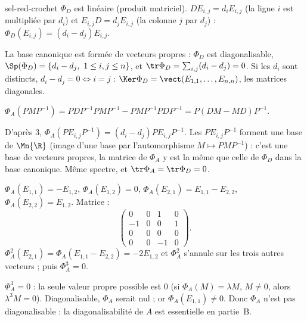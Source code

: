 \begin{corrige}{sel-red-crochet}
 $\Phi_D$ est linéaire (produit matriciel). $DE_{i,j}=d_iE_{i,j}$ (la ligne $i$ est multipliée par $d_i$) et $E_{i,j}D=d_jE_{i,j}$
(la colonne $j$ par $d_j$) : $\Phi_D(E_{i,j})=(d_i-d_j)E_{i,j}$.

 La base canonique est formée de vecteurs propres : $\Phi_D$ est diagonalisable, $\Sp(\Phi_D)=\{d_i-d_j,\ 1\leq i,j\leq n\}$, et
$\tr\Phi_D=\sum_{i,j}(d_i-d_j)=0$. Si les $d_i$ sont distincts, $d_i-d_j=0\iff i=j$ : $\Ker\Phi_D=\vect(E_{1,1},\dots,E_{n,n})$, les matrices
diagonales.

 $\Phi_A(PMP^{-1})=PDP^{-1}PMP^{-1}-PMP^{-1}PDP^{-1}=P(DM-MD)P^{-1}$.

 D'après 3, $\Phi_A(PE_{i,j}P^{-1})=(d_i-d_j)PE_{i,j}P^{-1}$. Les $PE_{i,j}P^{-1}$ forment une base de $\Mn{\R}$ (image d'une base par
l'automorphisme $M\mapsto PMP^{-1}$) : c'est une base de vecteurs propres, la matrice de $\Phi_A$ y est la même que celle de $\Phi_D$
dans la base canonique. Même spectre, et $\tr\Phi_A=\tr\Phi_D=0$.

 $\Phi_A(E_{1,1})=-E_{1,2}$, $\Phi_A(E_{1,2})=0$, $\Phi_A(E_{2,1})=E_{1,1}-E_{2,2}$, $\Phi_A(E_{2,2})=E_{1,2}$. Matrice :
\[\begin{pmatrix}0&0&1&0\\-1&0&0&1\\0&0&0&0\\0&0&-1&0\end{pmatrix}.\]
$\Phi_A^2(E_{2,1})=\Phi_A(E_{1,1}-E_{2,2})=-2E_{1,2}$ et $\Phi_A^2$ s'annule sur les trois autres vecteurs ; puis $\Phi_A^3=0$.

 $\Phi_A^3=0$ : la seule valeur propre possible est $0$ (si $\Phi_A(M)=\lambda M$, $M\neq0$, alors $\lambda^3M=0$). Diagonalisable,
$\Phi_A$ serait nul ; or $\Phi_A(E_{1,1})\neq0$. Donc $\Phi_A$ n'est pas diagonalisable : la diagonalisabilité de $A$ est essentielle en partie~B.
\end{corrige}


